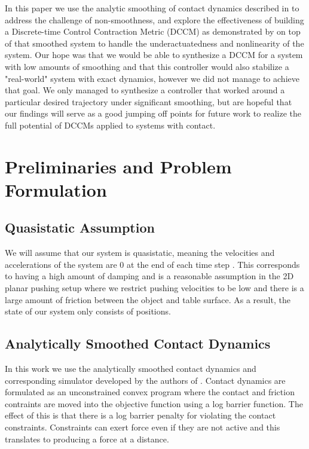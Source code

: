 \documentclass[journal]{IEEEtran}
\begin{document}
In this paper we use the analytic smoothing of contact dynamics described in \autocite{pangGlobalPlanningContactRich2023} to address the challenge of non-smoothness, and explore the effectiveness of building a Discrete-time Control Contraction Metric (DCCM) as demonstrated by \autocite{weiControlContractionMetric2021} on top of that smoothed system to handle the underactuatedness and nonlinearity of the system. Our hope was that we would be able to synthesize a DCCM for a system with low amounts of smoothing and that this controller would also stabilize a "real-world" system with exact dynamics, however we did not manage to achieve that goal. We only managed to synthesize a controller that worked around a particular desired trajectory under significant smoothing, but are hopeful that our findings will serve as a good jumping off points for future work to realize the full potential of DCCMs applied to systems with contact.

\section{Preliminaries and Problem Formulation}
\subsection{Quasistatic Assumption}
We will assume that our system is quasistatic, meaning the velocities and accelerations of the system are 0 at the end of each time step \autocite{pangGlobalPlanningContactRich2023}. This corresponds to having a high amount of damping and is a reasonable assumption in the 2D planar pushing setup where we restrict pushing velocities to be low and there is a large amount of friction between the object and table surface. As a result, the state of our system only consists of positions.

\subsection{Analytically Smoothed Contact Dynamics} \label{sec:smoothing}
In this work we use the analytically smoothed contact dynamics and corresponding simulator developed by the authors of \autocite{pangGlobalPlanningContactRich2023}. Contact dynamics are formulated as an unconstrained convex program where the contact and friction contraints are moved into the objective function using a log barrier function. The effect of this is that there is a log barrier penalty for violating the contact constraints. Constraints can exert force even if they are not active and this translates to producing a force at a distance.
\end{document}
